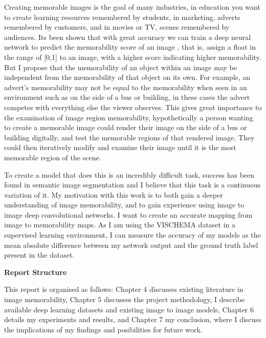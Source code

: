 \documentclass{UoYCSproject}
\begin{document}
Creating memorable images is the goal of many industries, in education you want to create learning resources remembered by students, in marketing, adverts remembered by customers, and in movies or TV, scenes remembered by audiences. Its been shown that with great accuracy we can train a deep neural network to predict the memorability score of an image \cite{Isola2011, IsolaParikhTorralbaOliva2011, ICCV15_Khosla, isola2014memorability},
that is, assign a float in the range of [0,1] to an image, with a higher score indicating higher memorability. But I propose that the memorability of an object within an image may be independent from the memorability of that object on its own. For example, an advert's memorability may not be equal to the memorability when seen in an environment such as on the side of a bus or building, in these cases the advert competes with everything else the viewer observes. This gives great importance to the examination of image region memorability, hypothetically a person wanting to create a memorable image could render their image on the side of a bus or building digitally, and test the memorable regions of that rendered image. They could then iteratively modify and examine their image until it is the most memorable region of the scene.


To create a model that does this is an incredibly difficult task, success has been found in semantic image segmentation \cite{wang2023internimage} and I believe that this task is a continuous variation of it. My motivation with this work is to both gain a deeper understanding of image memorability, and to gain experience using image to image deep convolutional networks. I want to create an accurate mapping from image to memorability maps. As I am using the VISCHEMA dataset in a supervised learning environment, I can measure the accuracy of my models as the mean absolute difference between my network output and the ground truth label present in the dataset.

\textbf{Report Structure}

This report is organised as follows: Chapter 4 discusses existing literature in image memorability, Chapter 5 discusses the project methodology, I describe available deep learning datasets and existing image to image models, Chapter 6 details my experiments and results, and Chapter 7 my conclusion, where I discuss the implications of my findings and posibilities for future work.    
\end{document}

